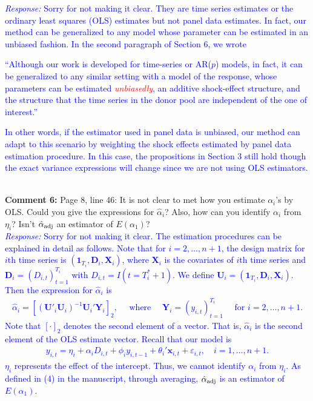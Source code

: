 \documentclass[12pt]{article}
\newcommand{\response}[1]{\noindent \textcolor{blue}{\emph{Response:} #1}}
\begin{document}
\response{Sorry for not making it clear. They are time series estimates or the ordinary least squares (OLS) estimates but not panel data estimates. In fact, our method can be generalized to any model whose parameter can be estimated in an unbiased fashion. In the second paragraph of Section 6, we wrote \\


\begin{tcolorbox}
``Although our work is developed for time-series or AR($p$) models, in fact, it can be generalized to any similar setting with a model of the response, whose parameters can be estimated \emph{\textcolor{red}{unbiasedly}}, an additive shock-effect structure, and the structure that the time series in the donor pool are independent of the one of interest.''
\end{tcolorbox}


\vspace{0.4cm}In other words, if the estimator used in panel data is unbiased, our method can adapt to this scenario by weighting the shock effects estimated by panel data estimation procedure. In this case, the propositions in Section 3 still hold though the exact variance expressions will change since we are not using OLS estimators.}\\


{\bf Comment 6:} Page 8, line 46: It is not clear to met how you estimate $\alpha_i$'s by OLS. Could you give the expressions for $\hat{\alpha}_i$? Also, how can you identify $\alpha_i$ from $\eta_i$? Isn't $\hat{\alpha}_{\rm adj}$ an estimator of $E(\alpha_1)$? \\

\response{Sorry for not making it clear. The estimation procedures can be explained in detail as follows. Note that for $i = 2, \ldots, n+1$, the design matrix for $i$th time series is $(\mathbf{1}_{T_i}, \mathbf{D}_{i}, \mathbf{X}_{i})$, where $\mathbf{X}_i$ is the covariates  of $i$th time series and $\mathbf{D}_{i}=(D_{i,t})_{t=1}^{T_i}$ with $D_{i,t}=I(t=T_i^*+1)$. We define $\mathbf{U}_i = (\mathbf{1}_{T_i}, \mathbf{D}_{i}, \mathbf{X}_{i})$. Then the expression for $\hat{\alpha}_i$ is
\begin{align*}
  \hat{\alpha}_i = [(\mathbf{U}'_i\mathbf{U}_i)^{-1}\mathbf{U}_i'\mathbf{Y}_{i}]_{2}, \quad 
  \text{ where }\quad \mathbf{Y}_{i}=(y_{i,t})_{t=1}^{T_i} 
 \quad  \text{ for } i = 2, \ldots, n+1.
\end{align*}
Note that $[\cdot]_{2}$ denotes the second element of a vector. That is, $\hat{\alpha}_i$ is the second element of the OLS estimate vector. Recall that our model is
\begin{align*}
  y_{i,t} = \eta_i + \alpha_i D_{i,t} + \phi_i y_{i,t-1} + \theta_i'\mathbf{x}_{i,t} + \varepsilon_{i,t}, 
  \quad i = 1, \ldots, n+1.
\end{align*}
$\eta_i$ represents the effect of the intercept. Thus, we cannot identify $\alpha_i$ from $\eta_i$. As defined in (4) in the manuscript, through averaging, $\hat{\alpha}_{\rm adj}$ is an estimator  of $E(\alpha_1)$.} \\
\end{document}
